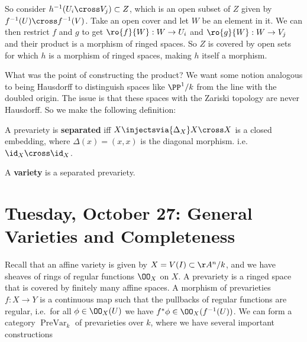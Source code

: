 So consider \(h^{-1} (U_i \cross V_j) \subset Z\), which is an open
subset of \(Z\) given by \(f^{-1}(U) \cross f^{-1}(V)\). Take an open
cover and let \(W\) be an element in it. We can then restrict \(f\) and
\(g\) to get \(\ro{f}{W}:W\to U_i\) and \(\ro{g}{W}:W\to V_j\) and their
product is a morphism of ringed spaces. So \(Z\) is covered by open sets
for which \(h\) is a morphism of ringed spaces, making \(h\) itself a
morphism.

What was the point of constructing the product? We want some notion
analogous to being Hausdorff to distinguish spaces like \(\PP^1/k\) from
the line with the doubled origin. The issue is that these spaces with
the Zariski topology are never Hausdorff. So we make the following
definition:

\begin{definition}[Separated]

A prevariety is \textbf{separated} iff
\(X \injectsvia{\Delta_X} X\cross X\) is a closed embedding, where
\(\Delta(x) = (x, x)\) is the diagonal morphism.
i.e.~\(\id_X \cross \id_X\).

\end{definition}

\begin{definition}[Variety]

A \textbf{variety} is a separated prevariety.

\end{definition}

\hypertarget{tuesday-october-27-general-varieties-and-completeness}{%
\section{Tuesday, October 27: General Varieties and
Completeness}\label{tuesday-october-27-general-varieties-and-completeness}}

Recall that an affine variety is given by \(X = V(I) \subset \AA^n/k\),
and we have sheaves of rings of regular functions \(\OO_X\) on \(X\). A
prevariety is a ringed space that is covered by finitely many affine
spaces. A morphism of prevarieties \(f:X\to Y\) is a continuous map such
that the pullbacks of regular functions are regular, i.e.~for all
\(\phi \in \OO_X(U)\) we have \(f^* \phi \in \OO_X(f^{-1} (U) )\). We
can form a category \(\operatorname{PreVar}_k\) of prevarieties over
\(k\), where we have several important constructions

